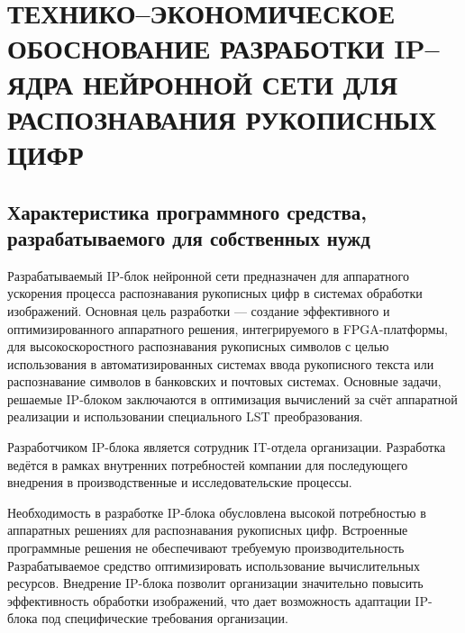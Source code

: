 \chapter[Технико–экономическое обоснование разработки IP–ядра нейронной сети для распознавания рукописных цифр]
{ТЕХНИКО–ЭКОНОМИЧЕСКОЕ ОБОСНОВАНИЕ РАЗРАБОТКИ IP–ЯДРА НЕЙРОННОЙ СЕТИ ДЛЯ РАСПОЗНАВАНИЯ РУКОПИСНЫХ ЦИФР}

\section{Характеристика программного средства, разрабатываемого для собственных нужд}\par
\hspace*{12.5 mm}Разрабатываемый IP-блок нейронной сети предназначен для 
аппаратного ускорения процесса распознавания рукописных цифр в системах 
обработки изображений. Основная цель разработки — создание эффективного и 
оптимизированного аппаратного решения, интегрируемого в FPGA-платформы, для 
высокоскоростного распознавания рукописных символов с целью использования в 
автоматизированных системах ввода рукописного текста или распознавание символов 
в банковских и почтовых системах. Основные задачи, решаемые IP-блоком 
заключаются в оптимизация вычислений за счёт аппаратной реализации и 
использовании специального LST преобразования.

Разработчиком IP-блока является сотрудник IT-отдела организации. Разработка 
ведётся в рамках внутренних потребностей компании для последующего внедрения в 
производственные и исследовательские процессы.

Необходимость в разработке IP-блока обусловлена высокой потребностью в 
аппаратных решениях для распознавания рукописных цифр. Встроенные программные 
решения не обеспечивают требуемую производительность Разрабатываемое средство 
оптимизировать использование вычислительных ресурсов. Внедрение IP-блока 
позволит организации значительно повысить эффективность обработки изображений, 
что дает возможность адаптации IP-блока под специфические требования 
организации.

